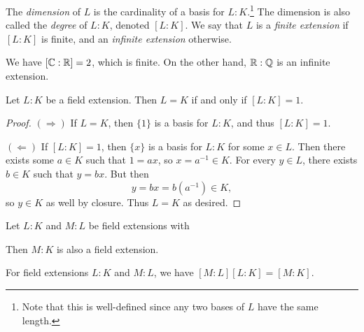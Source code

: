 \begin{definition}
  The \emph{dimension} of $L$
  is the cardinality of a basis for $L : K$.\footnote{Note that this is well-defined since any two bases of $L$ have the same length.}
  The dimension is also called the \emph{degree} of
  $L : K$, denoted $[L : K]$. We say that $L$ is a
  \emph{finite extension} if $[L : K]$ is finite, and
  an \emph{infinite extension} otherwise.
\end{definition}

\begin{example}
  We have $[\mathbb{C} : \mathbb{R}] = 2$, which is finite. On the
  other hand, $\mathbb{R} : \mathbb{Q}$ is an infinite extension.
\end{example}

\begin{theorem}
  Let $L : K$ be a field extension. Then
  $L = K$ if and only if $[L : K] = 1$.
\end{theorem}

\begin{proof}
  $(\Rightarrow)$ If $L = K$, then $\{1\}$ is a basis
  for $L : K$, and thus $[L : K] = 1$.

  $(\Leftarrow)$ If $[L : K] = 1$, then $\{x\}$ is a
  basis for $L : K$ for some $x \in L$. Then there exists
  some $a \in K$ such that $1 = ax$, so
  $x = a^{-1} \in K$. For every $y \in L$, there exists
  $b \in K$ such that $y = bx$. But then
  \[
    y = bx = b(a^{-1}) \in K,
  \]
  so $y \in K$ as well by closure. Thus $L = K$
  as desired.
\end{proof}

\begin{remark}
Let $L : K$ and $M : L$ be field extensions with
\begin{center}
\end{center}
Then $M : K$ is also a field extension.
\end{remark}

\begin{theorem}
  For field extensions $L : K$ and $M : L$, we have
  $[M : L][L : K] = [M : K]$.
\end{theorem}


